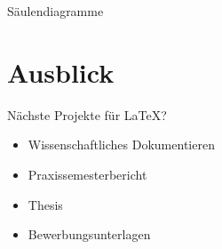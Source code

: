 \documentclass[presentation,aspectratio=169]{beamer}
\begin{document}
\begin{frame}{Säulendiagramme}
\end{frame}

\section{Ausblick}

\begin{frame}{Nächste Projekte für \LaTeX{}?}
  \begin{itemize}
    \item Wissenschaftliches Dokumentieren
    \item Praxissemesterbericht
    \item Thesis
    \bigskip
    \item Bewerbungsunterlagen
  \end{itemize}
\end{frame}
\end{document}
